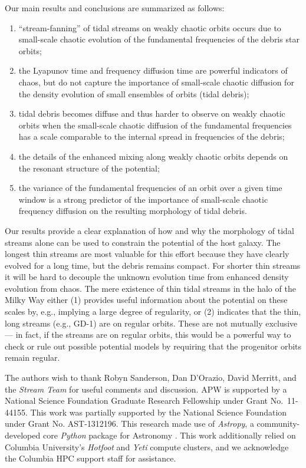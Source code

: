 \documentclass[letterpaper,12pt,preprint]{aastex}
\newcommand{\project}[1]{\textsl{#1}}
\begin{document}
Our main results and conclusions are summarized as follows:
\begin{enumerate}
	\item ``stream-fanning'' of tidal streams on weakly chaotic orbits \citep[as seen in simulations by][]{pearson15} occurs due to small-scale chaotic evolution of the fundamental frequencies of the debris star orbits;
	\item the Lyapunov time and frequency diffusion time are powerful indicators of chaos, but do not capture the importance of small-scale chaotic diffusion for the density evolution of small ensembles of orbits (tidal debris);
	\item tidal debris becomes diffuse and thus harder to observe on weakly chaotic orbits when the small-scale chaotic diffusion of the fundamental frequencies has a scale comparable to the internal spread in frequencies of the debris;
	\item the details of the enhanced mixing along weakly chaotic orbits depends on the resonant structure of the potential;
	\item the variance of the fundamental frequencies of an orbit over a given time window is a strong predictor of the importance of small-scale chaotic frequency diffusion on the resulting morphology of tidal debris.
\end{enumerate}

Our results provide a clear explanation of how and why the morphology of tidal streams alone can be used to constrain the potential of the host galaxy. The longest thin streams are most valuable for this effort because they have clearly evolved for a long time, but the debris remains compact. For shorter thin streams it will be hard to decouple the unknown evolution time from enhanced density evolution from chaos. The mere existence of thin tidal streams in the halo of the Milky Way either (1) provides useful information about the potential on these scales by, e.g., implying a large degree of regularity, or (2) indicates that the thin, long streams (e.g., GD-1) are on regular orbits. These are not mutually exclusive --- in fact, if the streams are on regular orbits, this would be a powerful way to check or rule out possible potential models by requiring that the progenitor orbits remain regular. 

\acknowledgements
The authors wish to thank Robyn Sanderson, Dan D'Orazio, David Merritt, and the \emph{Stream Team} for useful comments and discussion. APW is supported by a National Science Foundation Graduate Research Fellowship under Grant No.\ 11-44155. This work was partially supported by the National Science Foundation under Grant No. AST-1312196.  This research made use of \project{Astropy}, a community-developed core \project{Python} package for Astronomy \citep{astropy13}. This work additionally relied on Columbia University's \emph{Hotfoot} and \emph{Yeti} compute clusters, and we acknowledge the Columbia HPC support staff for assistance.
\end{document}
